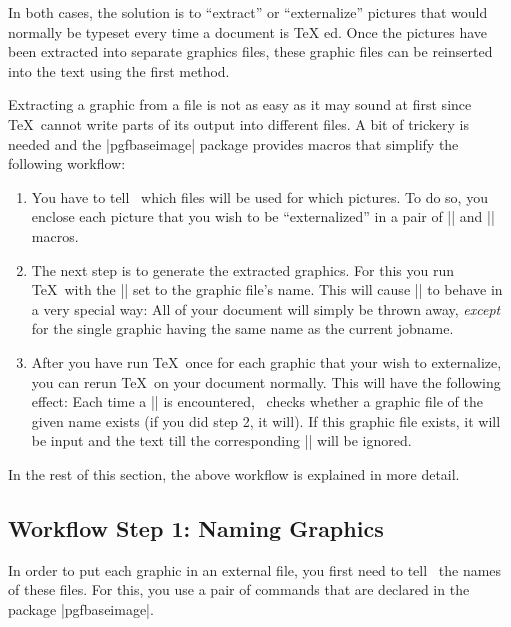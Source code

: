 In both cases, the solution is to ``extract'' or ``externalize''
pictures that would normally be typeset every time a document is \TeX
ed. Once the pictures have been extracted into separate graphics
files, these graphic files can be reinserted into the text using the
first method.

Extracting a graphic from a file is not as easy as it may sound at
first since \TeX\ cannot write parts of its output into different
files. A bit of trickery is needed and the |pgfbaseimage| package
provides macros that simplify the following workflow:

\begin{enumerate}
\item You have to tell \pgfname\ which files will be used for which
  pictures. To do so, you enclose each picture that you wish to be
  ``externalized'' in a pair of |\beginpgfgraphicnamed| and
  |\endpgfgraphicnamed| macros.
\item The next step is to generate the extracted graphics. For this
  you run \TeX\ with the |\jobname| set to the graphic file's
  name. This will cause |\pgfname| to behave in a very special way:
  All of your document will simply be thrown away, \emph{except} for
  the single graphic having the same name as the current jobname.
\item After you have run \TeX\ once for each graphic that your wish to
  externalize, you can rerun \TeX\ on your document normally. This
  will have the following effect: Each time a |\beginpgfgraphicnamed|
  is encountered, \pgfname\ checks whether a graphic file of the given
  name exists (if you did step 2, it will). If this graphic file
  exists, it will be input and the text till the corresponding
  |\endpgfgraphicnamed| will be ignored.
\end{enumerate}

In the rest of this section, the above workflow is explained in more
detail.


\subsection{Workflow Step 1: Naming Graphics}

In order to put each graphic in an external file, you first need to
tell \pgfname\ the names of these files. For this, you use a pair of
commands that are declared in the package |pgfbaseimage|.

